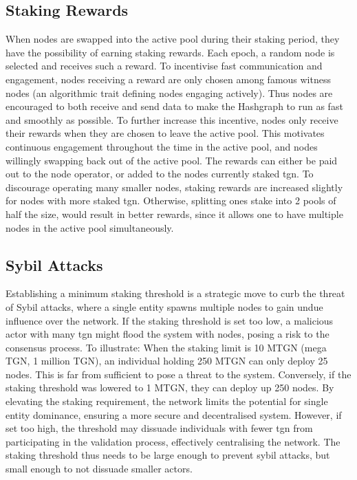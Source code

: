 \subsection{Staking Rewards}
    When nodes are swapped into the active pool during their staking period, they have the possibility of earning staking rewards. Each epoch, a random node is selected and receives such a reward. To incentivise fast communication and engagement, nodes receiving a reward are only chosen among famous witness nodes (an algorithmic trait defining nodes engaging actively). Thus nodes are encouraged to both receive and send data to make the Hashgraph to run as fast and smoothly as possible. To further increase this incentive, nodes only receive their rewards when they are chosen to leave the active pool. This motivates continuous engagement throughout the time in the active pool, and nodes willingly swapping back out of the active pool. The rewards can either be paid out to the node operator, or added to the nodes currently staked \gls{tgn}. To discourage operating many smaller nodes, staking rewards are increased slightly for nodes with more staked \gls{tgn}. Otherwise, splitting ones stake into 2 pools of half the size, would result in better rewards, since it allows one to have multiple nodes in the active pool simultaneously.

\subsection{Sybil Attacks}
    Establishing a minimum staking threshold is a strategic move to curb the threat of Sybil attacks, where a single entity spawns multiple nodes to gain undue influence over the network. If the staking threshold is set too low, a malicious actor with many \gls{tgn} might flood the system with nodes, posing a risk to the consensus process. To illustrate: When the  staking limit is 10 MTGN (mega TGN, 1 million TGN), an individual holding 250 MTGN can only deploy 25 nodes. This is far from sufficient to pose a threat to the system. Conversely, if the staking threshold was lowered to 1 MTGN, they can deploy up 250 nodes. By elevating the staking requirement, the network limits the potential for single entity dominance, ensuring a more secure and decentralised system. However, if set too high, the threshold may dissuade individuals with fewer \gls{tgn} from participating in the validation process, effectively centralising the network. The staking threshold thus needs to be large enough to prevent sybil attacks, but small enough to not dissuade smaller actors.

